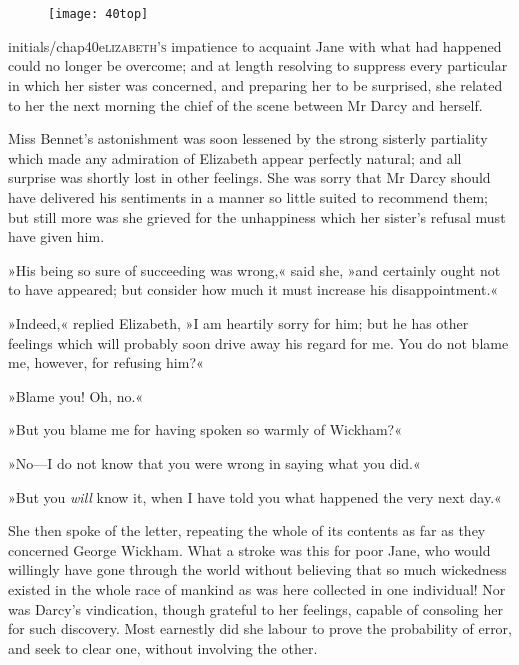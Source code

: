 \chapter[Chapter \thechapter]{}
	
	
\begin{figure}[t!]
\centering
\texttt{[image: 40top]}
\end{figure}


\lettrine[lines=6,image=true]{initials/chap40e}{lizabeth's} impatience to acquaint Jane with what had happened could no longer be overcome; and at length resolving to suppress every particular in which her sister was concerned, and preparing her to be surprised, she related to her the next morning the chief of the scene between Mr Darcy and herself.

\zz
Miss Bennet's astonishment was soon lessened by the strong sisterly partiality which made any admiration of Elizabeth appear perfectly natural; and all surprise was shortly lost in other feelings. She was sorry that Mr Darcy should have delivered his sentiments in a manner so little suited to recommend them; but still more was she grieved for the unhappiness which her sister's refusal must have given him.

»His being so sure of succeeding was wrong,« said she, »and certainly ought not to have appeared; but consider how much it must increase his disappointment.«

»Indeed,« replied Elizabeth, »I am heartily sorry for him; but he has other feelings which will probably soon drive away his regard for me. You do not blame me, however, for refusing him?«

»Blame you! Oh, no.«

»But you blame me for having spoken so warmly of Wickham?«

»No—I do not know that you were wrong in saying what you did.«

»But you \textit{will} know it, when I have told you what happened the very next day.«

She then spoke of the letter, repeating the whole of its contents as far as they concerned George Wickham. What a stroke was this for poor Jane, who would willingly have gone through the world without believing that so much wickedness existed in the whole race of mankind as was here collected in one individual! Nor was Darcy's vindication, though grateful to her feelings, capable of consoling her for such discovery. Most earnestly did she labour to prove the probability of error, and seek to clear one, without involving the other.

